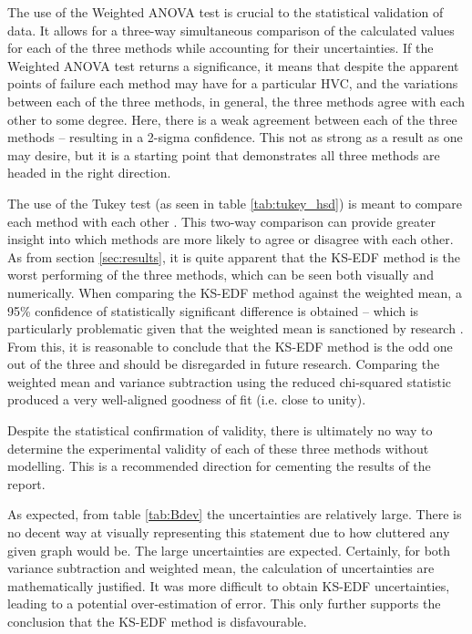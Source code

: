 The use of the Weighted ANOVA test is crucial to the statistical validation of data. It allows for a three-way simultaneous comparison of the calculated values for each of the three methods while accounting for their uncertainties. If the Weighted ANOVA test returns a significance, it means that despite the apparent points of failure each method may have for a particular HVC, and the variations between each of the three methods, in general, the three methods agree with each other to some degree. Here, there is a weak agreement between each of the three methods – resulting in a 2-sigma confidence. This not as strong as a result as one may desire, but it is a starting point that demonstrates all three methods are headed in the right direction.


The use of the Tukey test (as seen in table \ref{tab:tukey_hsd}) is meant to compare each method with each other \citep{ID77, ID78}. This two-way comparison can provide greater insight into which methods are more likely to agree or disagree with each other. As from section \ref{sec:results}, it is quite apparent that the KS-EDF method is the worst performing of the three methods, which can be seen both visually and numerically. When comparing the KS-EDF method against the weighted mean, a 95\% confidence of statistically significant difference is obtained – which is particularly problematic given that the weighted mean is sanctioned by research \citep{ID5, ID26}. From this, it is reasonable to conclude that the KS-EDF method is the odd one out of the three and should be disregarded in future research. Comparing the weighted mean and variance subtraction using the reduced chi-squared statistic produced a very well-aligned goodness of fit (i.e. close to unity).


Despite the statistical confirmation of validity, there is ultimately no way to determine the experimental validity of each of these three methods without modelling. This is a recommended direction for cementing the results of the report.


As expected, from table \ref{tab:Bdev} the uncertainties are relatively large. There is no decent way at visually representing this statement due to how cluttered any given graph would be. The large uncertainties are expected. Certainly, for both variance subtraction and weighted mean, the calculation of uncertainties are mathematically justified. It was more difficult to obtain KS-EDF uncertainties, leading to a potential over-estimation of error. This only further supports the conclusion that the KS-EDF method is disfavourable.


